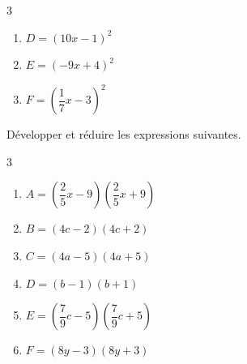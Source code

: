 {\begin{Exercice}
\begin{multicols}{3}
\begin{enumerate}[itemsep=1em,label={}]
	\item \begin{minipage}[t]{\linewidth}$D=\left(10x-1\right)^2$\end{minipage}
	\item \begin{minipage}[t]{\linewidth}$E=\left(-9x+4\right)^2$\end{minipage}
	\item \begin{minipage}[t]{\linewidth}$F=\left(\dfrac{1}{7}x-3\right)^2$\end{minipage}
\end{enumerate}
\end{multicols}
\end{Exercice}

\begin{Exercice}%
Développer et réduire les expressions suivantes.
\begin{multicols}{3}
\begin{enumerate}[itemsep=2em,label={}]
	\item \begin{minipage}[t]{\linewidth}$A = \left(\dfrac{2}{5}x-9\right)\left(\dfrac{2}{5}x+9\right)$\end{minipage}
	\item \begin{minipage}[t]{\linewidth}$B = (4c-2)(4c+2)$\end{minipage}
	\item \begin{minipage}[t]{\linewidth}$C = (4a-5)(4a+5)$\end{minipage}
	\item \begin{minipage}[t]{\linewidth}$D = (b-1)(b+1)$\end{minipage}
	\item \begin{minipage}[t]{\linewidth}$E = \left(\dfrac{7}{9}c-5\right)\left(\dfrac{7}{9}c+5\right)$\end{minipage}
	\item \begin{minipage}[t]{\linewidth}$F = (8y-3)(8y+3)$\end{minipage}
\end{enumerate}
\end{multicols}
\end{Exercice}

}
